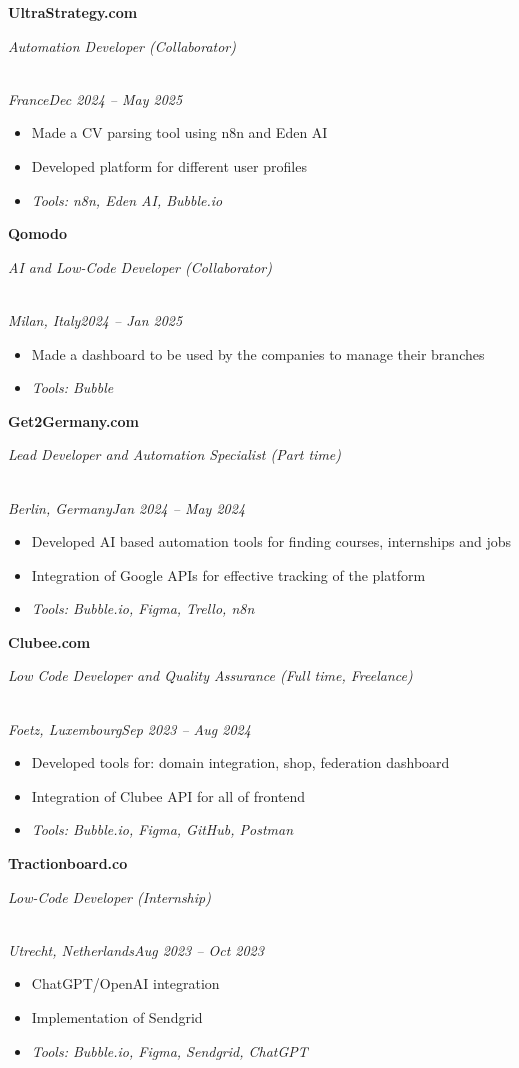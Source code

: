 \documentclass[a4paper,10pt]{article}
\newcommand{\role}[4]{\vspace{3pt}\noindent\hspace{0.6em}\parbox[t]{0.38\textwidth}{\raggedright\textbf{#1}}\hfill\parbox[t]{0.58\textwidth}{\raggedleft\textit{#2}}\\{\textit{#3}\hfill\textit{#4}}\vspace{1pt}}
\begin{document}
\role{UltraStrategy.com}{Automation Developer (Collaborator)}{France}{Dec 2024 -- May 2025}
\begin{itemize}
\item Made a CV parsing tool using n8n and Eden AI
\item Developed platform for different user profiles
\item \textit{Tools: n8n, Eden AI, Bubble.io}
\end{itemize}

\role{Qomodo}{AI and Low-Code Developer (Collaborator)}{Milan, Italy}{2024 -- Jan 2025}
\begin{itemize}
\item Made a dashboard to be used by the companies to manage their branches
\item \textit{Tools: Bubble}
\end{itemize}

\role{Get2Germany.com}{Lead Developer and Automation Specialist (Part time)}{Berlin, Germany}{Jan 2024 -- May 2024}
\begin{itemize}
\item Developed AI based automation tools for finding courses, internships and jobs
\item Integration of Google APIs for effective tracking of the platform
\item \textit{Tools: Bubble.io, Figma, Trello, n8n}
\end{itemize}

\role{Clubee.com}{Low Code Developer and Quality Assurance (Full time, Freelance)}{Foetz, Luxembourg}{Sep 2023 -- Aug 2024}
\begin{itemize}
\item Developed tools for: domain integration, shop, federation dashboard
\item Integration of Clubee API for all of frontend
\item \textit{Tools: Bubble.io, Figma, GitHub, Postman}
\end{itemize}

\role{Tractionboard.co}{Low-Code Developer (Internship)}{Utrecht, Netherlands}{Aug 2023 -- Oct 2023}
\begin{itemize}
\item ChatGPT/OpenAI integration
\item Implementation of Sendgrid
\item \textit{Tools: Bubble.io, Figma, Sendgrid, ChatGPT}
\end{itemize}
\end{document}
